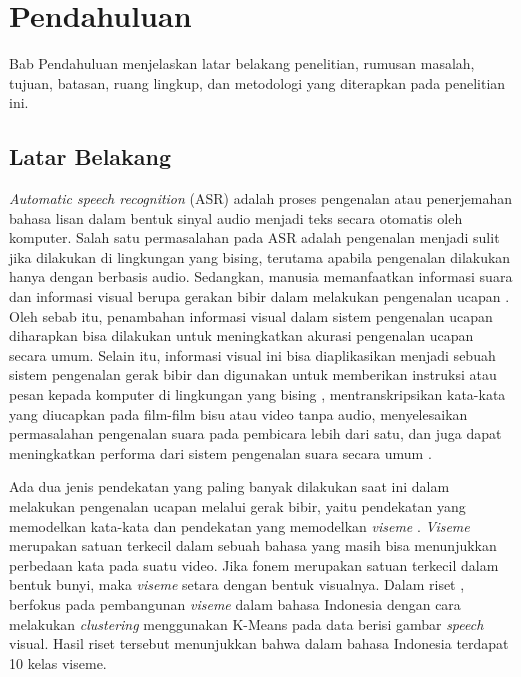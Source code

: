 \chapter{Pendahuluan}

Bab Pendahuluan menjelaskan latar belakang penelitian, rumusan masalah, tujuan, batasan, ruang lingkup, dan metodologi yang diterapkan pada penelitian ini.


\section{Latar Belakang}

\textit{Automatic speech recognition} (ASR) adalah proses pengenalan atau penerjemahan bahasa lisan dalam bentuk sinyal audio menjadi teks secara otomatis oleh komputer. Salah satu permasalahan pada ASR adalah pengenalan menjadi sulit jika dilakukan di lingkungan yang bising, terutama apabila pengenalan dilakukan hanya dengan berbasis audio. Sedangkan, manusia memanfaatkan informasi suara dan informasi visual berupa gerakan bibir dalam melakukan pengenalan ucapan \parencite{Calvert2004}. Oleh sebab itu, penambahan informasi visual dalam sistem pengenalan ucapan diharapkan bisa dilakukan untuk meningkatkan akurasi pengenalan ucapan secara umum. Selain itu, informasi visual ini bisa diaplikasikan menjadi sebuah sistem pengenalan gerak bibir dan digunakan untuk memberikan instruksi atau pesan kepada komputer di lingkungan yang bising \parencite{Garg2016}, mentranskripsikan kata-kata yang diucapkan pada film-film bisu atau video tanpa audio, menyelesaikan permasalahan pengenalan suara pada pembicara lebih dari satu, dan juga dapat meningkatkan performa dari sistem pengenalan suara secara umum \parencite{Chung2017}.
\bigskip

Ada dua jenis pendekatan yang paling banyak dilakukan saat ini dalam melakukan pengenalan ucapan melalui gerak bibir, yaitu pendekatan yang memodelkan kata-kata \parencite{Wand2016} dan pendekatan yang memodelkan \textit{viseme} \parencite{Chung2017}. \textit{Viseme} merupakan satuan terkecil dalam sebuah bahasa yang masih bisa menunjukkan perbedaan kata pada suatu video. Jika fonem merupakan satuan terkecil dalam bentuk bunyi, maka \textit{viseme} setara dengan bentuk visualnya. Dalam riset \textcite{Arifin2013}, berfokus pada pembangunan \textit{viseme} dalam bahasa Indonesia dengan cara melakukan \textit{clustering} menggunakan K-Means pada data berisi gambar \textit{speech} visual. Hasil riset tersebut menunjukkan bahwa dalam bahasa Indonesia terdapat 10 kelas viseme.
\bigskip


